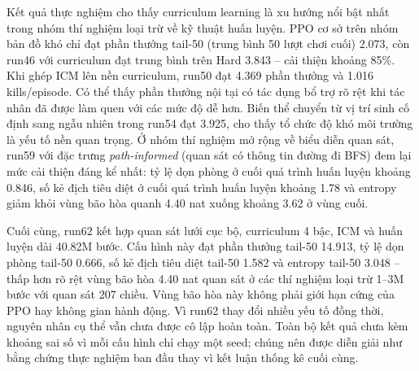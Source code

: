 Kết quả thực nghiệm cho thấy curriculum learning là xu hướng nổi bật nhất trong nhóm thí nghiệm loại trừ về kỹ thuật huấn luyện. PPO cơ sở trên nhóm bản đồ khó chỉ đạt phần thưởng tail-50 (trung bình 50 lượt chơi cuối) 2.073, còn run46 với curriculum đạt trung bình trên Hard 3.843 -- cải thiện khoảng 85\%. Khi ghép ICM lên nền curriculum, run50 đạt 4.369 phần thưởng và 1.016 kills/episode. Có thể thấy phần thưởng nội tại có tác dụng bổ trợ rõ rệt khi tác nhân đã được làm quen với các mức độ dễ hơn. Biến thể chuyển từ vị trí sinh cố định sang ngẫu nhiên trong run54 đạt 3.925, cho thấy tổ chức độ khó môi trường là yếu tố nền quan trọng. Ở nhóm thí nghiệm mở rộng về biểu diễn quan sát, run59 với đặc trưng \emph{path-informed} (quan sát có thông tin đường đi BFS) đem lại mức cải thiện đáng kể nhất: tỷ lệ dọn phòng ở cuối quá trình huấn luyện khoảng 0.846, số kẻ địch tiêu diệt ở cuối quá trình huấn luyện khoảng 1.78 và entropy giảm khỏi vùng bão hòa quanh 4.40 nat xuống khoảng 3.62 ở vùng cuối.

Cuối cùng, run62 kết hợp quan sát lưới cục bộ, curriculum 4 bậc, ICM và huấn luyện dài 40.82M bước. Cấu hình này đạt phần thưởng tail-50 14.913, tỷ lệ dọn phòng tail-50 0.666, số kẻ địch tiêu diệt tail-50 1.582 và entropy tail-50 3.048 -- thấp hơn rõ rệt vùng bão hòa 4.40 nat quan sát ở các thí nghiệm loại trừ 1--3M bước với quan sát 207 chiều. Vùng bão hòa này không phải giới hạn cứng của PPO hay không gian hành động. Vì run62 thay đổi nhiều yếu tố đồng thời, nguyên nhân cụ thể vẫn chưa được cô lập hoàn toàn. Toàn bộ kết quả chưa kèm khoảng sai số vì mỗi cấu hình chỉ chạy một seed; chúng nên được diễn giải như bằng chứng thực nghiệm ban đầu thay vì kết luận thống kê cuối cùng.


